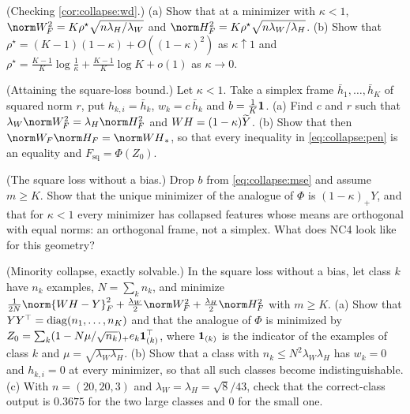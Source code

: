 \begin{refsection}
\begin{exercises}
\item \consolidation (Checking \cref{cor:collapse:wd}.) (a) Show that at a minimizer with $\kappa<1$, $\norm W_F^2=K\rho^\star\sqrt{n\lambda_H/\lambda_W}$ and $\norm H_F^2=K\rho^\star\sqrt{n\lambda_W/\lambda_H}$. (b) Show that $\rho^\star=(K-1)(1-\kappa)+O((1-\kappa)^2)$ as $\kappa\uparrow1$ and $\rho^\star=\frac{K-1}K\log\frac1\kappa+\frac{K-1}K\log K+o(1)$ as $\kappa\to0$. \label{ex:collapse:wdcheck}

\item \consolidation (Attaining the square-loss bound.) Let $\kappa<1$. Take a simplex frame $\bar h_1,\dots,\bar h_K$ of squared norm $r$, put $h_{k,i}=\bar h_k$, $w_k=c\,\bar h_k$ and $b=\frac1K\mathbf 1$. (a) Find $c$ and $r$ such that $\lambda_W\norm W_F^2=\lambda_H\norm H_F^2$ and $WH=(1-\kappa)\widetilde Y$. (b) Show that then $\norm W_F\norm H_F=\collapsenuc{WH}$, so that every inequality in \eqref{eq:collapse:pen} is an equality and $F_{\mathrm{sq}}=\Phi(Z_0)$. \label{ex:collapse:mseattain}

\item \variation (The square loss without a bias.) Drop $b$ from \eqref{eq:collapse:mse} and assume $m\ge K$. Show that the unique minimizer of the analogue of $\Phi$ is $(1-\kappa)_+Y$, and that for $\kappa<1$ every minimizer has collapsed features whose means are orthogonal with equal norms: an orthogonal frame, not a simplex. What does NC4 look like for this geometry? \label{ex:collapse:nobias}

\item \variation (Minority collapse, exactly solvable.) In the square loss without a bias, let class $k$ have $n_k$ examples, $N=\sum_kn_k$, and minimize $\frac1{2N}\norm{WH-Y}_F^2+\frac{\lambda_W}2\norm W_F^2+\frac{\lambda_H}2\norm H_F^2$ with $m\ge K$. (a) Show that $YY^\top=\operatorname{diag}(n_1,\dots,n_K)$ and that the analogue of $\Phi$ is minimized by $Z_0=\sum_k(1-N\mu/\sqrt{n_k})_+e_k\mathbf 1_{(k)}^\top$, where $\mathbf 1_{(k)}$ is the indicator of the examples of class $k$ and $\mu=\sqrt{\lambda_W\lambda_H}$.  (b) Show that a class with $n_k\le N^2\lambda_W\lambda_H$ has $w_k=0$ and $h_{k,i}=0$ at every minimizer, so that all such classes become indistinguishable. (c) With $n=(20,20,3)$ and $\lambda_W=\lambda_H=\sqrt8/43$, check that the correct-class output is $0.3675$ for the two large classes and $0$ for the small one. \label{ex:collapse:imbalance}


\end{exercises}
\end{refsection}
